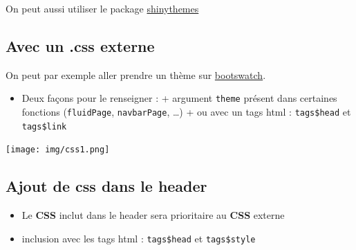 \documentclass[
]{article}
\newenvironment{Shaded}{\begin{snugshade}}{\end{snugshade}}
\newcommand{\AttributeTok}[1]{\textcolor[rgb]{0.77,0.63,0.00}{#1}}
\newcommand{\CommentTok}[1]{\textcolor[rgb]{0.56,0.35,0.01}{\textit{#1}}}
\newcommand{\FunctionTok}[1]{\textcolor[rgb]{0.00,0.00,0.00}{#1}}
\newcommand{\NormalTok}[1]{#1}
\newcommand{\OtherTok}[1]{\textcolor[rgb]{0.56,0.35,0.01}{#1}}
\newcommand{\SpecialCharTok}[1]{\textcolor[rgb]{0.00,0.00,0.00}{#1}}
\newcommand{\StringTok}[1]{\textcolor[rgb]{0.31,0.60,0.02}{#1}}
\providecommand{\tightlist}{%
  \setlength{\itemsep}{0pt}\setlength{\parskip}{0pt}}
\begin{document}
On peut aussi utiliser le package
\href{http://rstudio.github.io/shinythemes}{shinythemes}

\hypertarget{avec-un-.css-externe}{%
\subsection{Avec un .css externe}\label{avec-un-.css-externe}}

On peut par exemple aller prendre un thème sur
\href{http://bootswatch.com/}{bootswatch}.

\begin{itemize}
\tightlist
\item
  Deux façons pour le renseigner : + argument \texttt{theme} présent
  dans certaines fonctions (\texttt{fluidPage}, \texttt{navbarPage},
  \ldots) + ou avec un tags html : \texttt{tags\$head} et
  \texttt{tags\$link}
\end{itemize}

\begin{Shaded}
\end{Shaded}

\texttt{[image: img/css1.png]}

\hypertarget{ajout-de-css-dans-le-header}{%
\subsection{Ajout de css dans le
header}\label{ajout-de-css-dans-le-header}}

\begin{itemize}
\tightlist
\item
  Le \textbf{CSS} inclut dans le header sera prioritaire au \textbf{CSS}
  externe
\item
  inclusion avec les tags html : \texttt{tags\$head} et
  \texttt{tags\$style}
\end{itemize}
\end{document}
